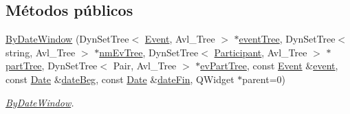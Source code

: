 \subsection*{Métodos públicos}
\begin{DoxyCompactItemize}
\item 
\hyperlink{class_by_date_window_a7467a6d0f2477ef387fab7da970b0dbd}{By\+Date\+Window} (Dyn\+Set\+Tree$<$ \hyperlink{class_event}{Event}, Avl\+\_\+\+Tree $>$ $\ast$\hyperlink{class_by_date_window_a516272658a7cef85f7021e05ee92a0ae}{event\+Tree}, Dyn\+Set\+Tree$<$ string, Avl\+\_\+\+Tree $>$ $\ast$\hyperlink{class_by_date_window_a1e9409ec21f9701ab09ea9eeacb97a7a}{nm\+Ev\+Tree}, Dyn\+Set\+Tree$<$ \hyperlink{class_participant}{Participant}, Avl\+\_\+\+Tree $>$ $\ast$\hyperlink{class_by_date_window_a39f0167d65618b4976e1d654c26356ce}{part\+Tree}, Dyn\+Set\+Tree$<$ Pair, Avl\+\_\+\+Tree $>$ $\ast$\hyperlink{class_by_date_window_ada66054845b0c347656b01275433b85c}{ev\+Part\+Tree}, const \hyperlink{class_event}{Event} \&\hyperlink{class_by_date_window_a8afd6558e3fc1081d1dd22a68412e864}{event}, const \hyperlink{class_date}{Date} \&\hyperlink{class_by_date_window_ae5c7c0a683a62d39adab2cb970191a36}{date\+Beg}, const \hyperlink{class_date}{Date} \&\hyperlink{class_by_date_window_a59f3946fff2b2b8333a42d7b2beecdca}{date\+Fin}, Q\+Widget $\ast$parent=0)
\begin{DoxyCompactList}\small\item\em \hyperlink{class_by_date_window}{By\+Date\+Window}. \end{DoxyCompactList}\end{DoxyCompactItemize}
